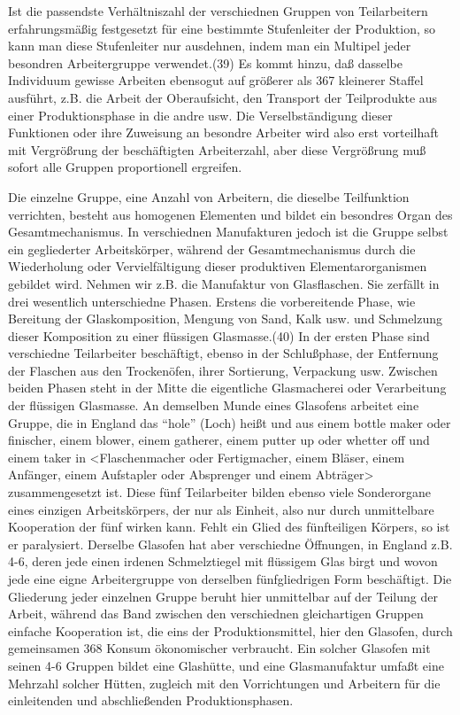 {Ist die passendste Verhältniszahl der verschiednen Gruppen von
Teilarbeitern erfahrungsmäßig festgesetzt für eine bestimmte
Stufenleiter der Produktion, so kann man diese Stufenleiter nur
ausdehnen, indem man ein Multipel jeder besondren Arbeitergruppe
verwendet.(39) Es kommt hinzu, daß dasselbe Individuum gewisse Arbeiten
ebensogut auf größerer als \num{367} kleinerer
Staffel ausführt, z.B. die Arbeit der Oberaufsicht, den Transport der
Teilprodukte aus einer Produktionsphase in die andre usw. Die
Verselbständigung dieser Funktionen oder ihre Zuweisung an besondre
Arbeiter wird also erst vorteilhaft mit Vergrößrung der beschäftigten
Arbeiterzahl, aber diese Vergrößrung muß sofort alle Gruppen
proportionell ergreifen.

Die einzelne Gruppe, eine Anzahl von Arbeitern, die dieselbe
Teilfunktion verrichten, besteht aus homogenen Elementen und bildet ein
besondres Organ des Gesamtmechanismus. In verschiednen Manufakturen
jedoch ist die Gruppe selbst ein gegliederter Arbeitskörper, während der
Gesamtmechanismus durch die Wiederholung oder Vervielfältigung dieser
produktiven Elementarorganismen gebildet wird. Nehmen wir z.B. die
Manufaktur von Glasflaschen. Sie zerfällt in drei wesentlich
unterschiedne Phasen. Erstens die vorbereitende Phase, wie Bereitung der
Glaskomposition, Mengung von Sand, Kalk usw. und Schmelzung dieser
Komposition zu einer flüssigen Glasmasse.(40) In der ersten Phase sind
verschiedne Teilarbeiter beschäftigt, ebenso in der Schlußphase, der
Entfernung der Flaschen aus den Trockenöfen, ihrer Sortierung,
Verpackung usw. Zwischen beiden Phasen steht in der Mitte die
eigentliche Glasmacherei oder Verarbeitung der flüssigen Glasmasse. An
demselben Munde eines Glasofens arbeitet eine Gruppe, die in England das
``hole'' (Loch) heißt und aus einem bottle maker oder finischer, einem
blower, einem gatherer, einem putter up oder whetter off und einem taker
in \textless{}Flaschenmacher oder Fertigmacher, einem Bläser, einem
Anfänger, einem Aufstapler oder Absprenger und einem
Abträger\textgreater{} zusammengesetzt ist. Diese fünf Teilarbeiter
bilden ebenso viele Sonderorgane eines einzigen Arbeitskörpers, der nur
als Einheit, also nur durch unmittelbare Kooperation der fünf wirken
kann. Fehlt ein Glied des fünfteiligen Körpers, so ist er paralysiert.
Derselbe Glasofen hat aber verschiedne Öffnungen, in England z.B. 4-6,
deren jede einen irdenen Schmelztiegel mit flüssigem Glas birgt und
wovon jede eine eigne Arbeitergruppe von derselben fünfgliedrigen Form
beschäftigt. Die Gliederung jeder einzelnen Gruppe beruht hier
unmittelbar auf der Teilung der Arbeit, während das Band zwischen den
verschiednen gleichartigen Gruppen einfache Kooperation ist, die eins
der Produktionsmittel, hier den Glasofen, durch gemeinsamen
\num{368} Konsum ökonomischer verbraucht. Ein solcher
Glasofen mit seinen 4-6 Gruppen bildet eine Glashütte, und eine
Glasmanufaktur umfaßt eine Mehrzahl solcher Hütten, zugleich mit den
Vorrichtungen und Arbeitern für die einleitenden und abschließenden
Produktionsphasen.

}
